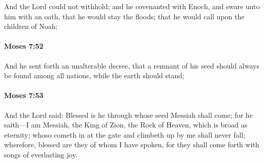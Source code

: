 			And the Lord could not withhold; and he covenanted with Enoch, and sware unto him with an oath, that he would stay the floods; that he would call upon the children of Noah;


		\paragraph{Moses 7:52} %
			\label{MOSES-7-52}

			And he sent forth an unalterable decree, that a remnant of his seed should always be found among all nations, while the earth should stand;


		\paragraph{Moses 7:53} %
			\label{MOSES-7-53}

			And the Lord said: Blessed is he through whose seed Messiah shall come; for he saith---I am Messiah, the King of Zion, the Rock of Heaven, which is broad as eternity; whoso cometh in at the gate and climbeth up by me shall never fall; wherefore, blessed are they of whom I have spoken, for they shall come forth with songs of everlasting joy.



